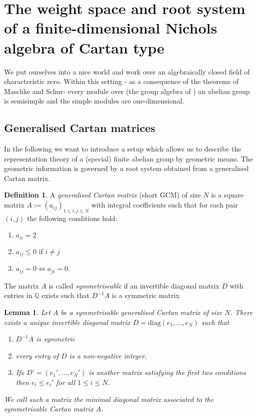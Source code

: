 \documentclass{amsart}
\newtheorem{lemma}[theorem]{Lemma}
\theoremstyle{definition}
\newtheorem{definition}[theorem]{Definition}
\begin{document}
\section{The weight space and root system of a finite-dimensional Nichols algebra of Cartan type}

We put ourselves into a nice world and work over an algebraically closed field of characteristic zero.
Within this setting - as a consequence of the theorems of Maschke and Schur- every module over (the group algebra of ) an abelian group is semisimple and the simple modules are one-dimensional. 

\subsection{Generalised Cartan matrices}

In the following we want to introduce a setup which allows us to describe the representation theory of a (special) finite abelian group by geometric means. The geometric information is governed by a root system obtained from a generalised Cartan matrix.

\begin{definition}{\cite[1.1.1 and 1.1.5]{Kumar2002}}
	A \emph{generalised Cartan matrix} (short GCM) of size $N$ is a square matrix
	$A := (a_{ij})_{1 \leq i,j \leq N}$ with integral coefficients such that for each pair $(i,j)$ the following conditions hold:
	\begin{enumerate}
		\item $a_{ii}= 2$
		\item $a_{ij}\leq 0 $ if $i \neq j$
		\item $a_{ij} = 0 \Leftrightarrow a_{ji} = 0$.
	\end{enumerate}

	The matrix $A$ is called \emph{symmetriseable} if an invertible diagonal matrix $D$ with entries in $\mathbb Q$ exists such that
	$D^{-1} A$ is a symmetric matrix. 
\end{definition}


\begin{lemma}{\cite[1.1.5]{Kumar2002}}
	Let $A$ be a symmetrisable generalised Cartan matrix of size $N$.
	There exists a unique invertible diagonal matrix $D= \text{diag}(e_1,\dotsc, e_N)$ such that
	\begin{enumerate}
		\item $D^{-1} A$ is symmetric
		\item every entry of $D$ is a non-negative integer,
		\item Ifx $D'=(e_1',\dotsc, e_N') $ is another matrix satisfying the first two conditions 
		then $e_i\leq e_i'$ for all $1 \leq i \leq N$.
	\end{enumerate}
	We call such a matrix the \emph{minimal diagonal} matrix associated to the symmetrisable Cartan matrix $A$.
\end{lemma}
\end{document}
